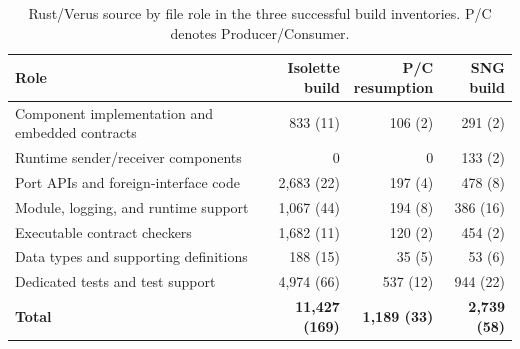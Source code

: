 \begin{table}[!htbp]
\caption{Rust/Verus source by file role in the three successful build inventories. P/C denotes Producer/Consumer.}
\label{tab:role-rust}
\centering\small
\setlength{\tabcolsep}{4pt}
\begin{tabular}{@{}>{\raggedright\arraybackslash}p{.50\linewidth}rrr@{}}
\toprule
Role & \shortstack[r]{Isolette\\build} & \shortstack[r]{P/C\\resumption} & \shortstack[r]{SNG\\build} \\
\midrule
Component implementation and embedded contracts & 833 (11) & 106 (2) & 291 (2) \\
Runtime sender/receiver components & 0 & 0 & 133 (2) \\
Port APIs and foreign-interface code & 2,683 (22) & 197 (4) & 478 (8) \\
Module, logging, and runtime support & 1,067 (44) & 194 (8) & 386 (16) \\
Executable contract checkers & 1,682 (11) & 120 (2) & 454 (2) \\
Data types and supporting definitions & 188 (15) & 35 (5) & 53 (6) \\
Dedicated tests and test support & 4,974 (66) & 537 (12) & 944 (22) \\
\midrule
\textbf{Total} & \textbf{11,427 (169)} & \textbf{1,189 (33)} & \textbf{2,739 (58)} \\
\bottomrule
\end{tabular}
\end{table}

